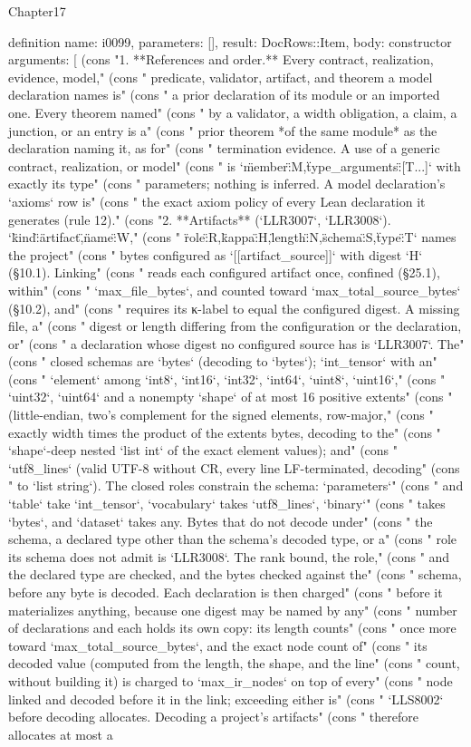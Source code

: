 \begin{lexlean}{Chapter17}
\begin{semanticmodule}
definition{
  name: i0099,
  parameters: [],
  result: DocRows::Item,
  body: constructor{
    arguments: [
      (cons "1. **References and order.** Every contract, realization, evidence, model," (cons "   predicate, validator, artifact, and theorem a model declaration names is" (cons "   a prior declaration of its module or an imported one. Every theorem named" (cons "   by a validator, a width obligation, a claim, a junction, or an entry is a" (cons "   prior theorem *of the same module* as the declaration naming it, as for" (cons "   termination evidence. A use of a generic contract, realization, or model" (cons "   is `{\"member\":M,\"type_arguments\":[T...]}` with exactly its type" (cons "   parameters; nothing is inferred. A model declaration's `axioms` row is" (cons "   the exact axiom policy of every Lean declaration it generates (rule 12)." (cons "2. **Artifacts** (`LLR3007`, `LLR3008`). `{\"kind\":\"artifact\",\"name\":W," (cons "   \"role\":R,\"kappa\":H,\"length\":N,\"schema\":S,\"type\":T}` names the project" (cons "   bytes configured as `[[artifact_source]]` with digest `H` (§10.1). Linking" (cons "   reads each configured artifact once, confined (§25.1), within" (cons "   `max_file_bytes`, and counted toward `max_total_source_bytes` (§10.2), and" (cons "   requires its κ-label to equal the configured digest. A missing file, a" (cons "   digest or length differing from the configuration or the declaration, or" (cons "   a declaration whose digest no configured source has is `LLR3007`. The" (cons "   closed schemas are `bytes` (decoding to `bytes`); `int_tensor` with an" (cons "   `element` among `int8`, `int16`, `int32`, `int64`, `uint8`, `uint16`," (cons "   `uint32`, `uint64` and a nonempty `shape` of at most 16 positive extents" (cons "   (little-endian, two's complement for the signed elements, row-major," (cons "   exactly width times the product of the extents bytes, decoding to the" (cons "   `shape`-deep nested `list int` of the exact element values); and" (cons "   `utf8_lines` (valid UTF-8 without CR, every line LF-terminated, decoding" (cons "   to `list string`). The closed roles constrain the schema: `parameters`" (cons "   and `table` take `int_tensor`, `vocabulary` takes `utf8_lines`, `binary`" (cons "   takes `bytes`, and `dataset` takes any. Bytes that do not decode under" (cons "   the schema, a declared type other than the schema's decoded type, or a" (cons "   role its schema does not admit is `LLR3008`. The rank bound, the role," (cons "   and the declared type are checked, and the bytes checked against the" (cons "   schema, before any byte is decoded. Each declaration is then charged" (cons "   before it materializes anything, because one digest may be named by any" (cons "   number of declarations and each holds its own copy: its length counts" (cons "   once more toward `max_total_source_bytes`, and the exact node count of" (cons "   its decoded value (computed from the length, the shape, and the line" (cons "   count, without building it) is charged to `max_ir_nodes` on top of every" (cons "   node linked and decoded before it in the link; exceeding either is" (cons "   `LLS8002` before decoding allocates. Decoding a project's artifacts" (cons "   therefore allocates at most a }}
\end{semanticmodule}
\end{lexlean}
